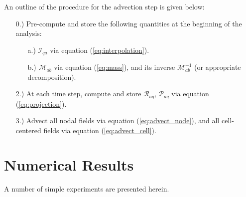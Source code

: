 \documentclass[12pt]{article}
\begin{document}
An outline of the procedure for the advection step is given below:
\begin{itemize}
\item[0.)] Pre-compute and store the following quantities at the beginning of the analysis:
  \begin{itemize}
  \item[a.)] $\mathcal{I}_{qa}$ via equation (\ref{eq:interpolation}).
  \item[b.)] $\mathcal{M}_{ab}$ via equation (\ref{eq:mass}), and its inverse $\mathcal{M}_{ab}^{-1}$ (or appropriate decomposition).
  \end{itemize}
\item[2.)] At each time step, compute and store $\mathcal{R}_{aq}$, $\mathcal{P}_{aq}$ via equation (\ref{eq:projection}).
\item[3.)] Advect all nodal fields via equation (\ref{eq:advect_node}), and all cell-centered fields via equation (\ref{eq:advect_cell}).
\end{itemize}


\section{Numerical Results}

A number of simple experiments are presented herein.


{}

\end{document}
